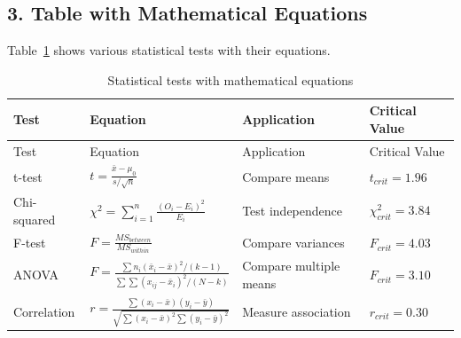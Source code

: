 \documentclass[
  letterpaper,
  oneside,
  openany]{MastersDoctoralThesis}
\begin{document}
\subsection{3. Table with Mathematical
Equations}\label{sec-app-b-equations}

Table~\ref{tbl-app-b-eq} shows various statistical tests with their
equations.

\begin{longtable}[]{@{}
  >{\raggedright\arraybackslash}p{}
  >{\raggedright\arraybackslash}p{}
  >{\raggedright\arraybackslash}p{}
  >{\raggedright\arraybackslash}p{}@{}}
\caption{Statistical tests with mathematical
equations}\label{tbl-app-b-eq}\tabularnewline
\toprule\noalign{}
\begin{minipage}[b]{\linewidth}\raggedright
Test
\end{minipage} & \begin{minipage}[b]{\linewidth}\raggedright
Equation
\end{minipage} & \begin{minipage}[b]{\linewidth}\raggedright
Application
\end{minipage} & \begin{minipage}[b]{\linewidth}\raggedright
Critical Value
\end{minipage} \\
\midrule\noalign{}
\endfirsthead
\toprule\noalign{}
\begin{minipage}[b]{\linewidth}\raggedright
Test
\end{minipage} & \begin{minipage}[b]{\linewidth}\raggedright
Equation
\end{minipage} & \begin{minipage}[b]{\linewidth}\raggedright
Application
\end{minipage} & \begin{minipage}[b]{\linewidth}\raggedright
Critical Value
\end{minipage} \\
\midrule\noalign{}
\endhead
\bottomrule\noalign{}
\endlastfoot
t-test & \(t = \frac{\bar{x} - \mu_0}{s/\sqrt{n}}\) & Compare means &
\(t_{crit} = 1.96\) \\
Chi-squared & \(\chi^2 = \sum_{i=1}^{n} \frac{(O_i - E_i)^2}{E_i}\) &
Test independence & \(\chi^2_{crit} = 3.84\) \\
F-test & \(F = \frac{MS_{between}}{MS_{within}}\) & Compare variances &
\(F_{crit} = 4.03\) \\
ANOVA &
\(F = \frac{\sum n_i(\bar{x}_i - \bar{x})^2/(k-1)}{\sum\sum(x_{ij} - \bar{x}_i)^2/(N-k)}\)
& Compare multiple means & \(F_{crit} = 3.10\) \\
Correlation &
\(r = \frac{\sum(x_i - \bar{x})(y_i - \bar{y})}{\sqrt{\sum(x_i - \bar{x})^2\sum(y_i - \bar{y})^2}}\)
& Measure association & \(r_{crit} = 0.30\) \\
\end{longtable}
\end{document}
